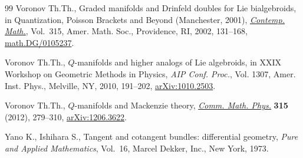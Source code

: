 \documentclass[11pt]{article}
\numberwithin{equation}{section}
\begin{document}
\begin{thebibliography}{99}
Voronov Th.Th., Graded manifolds and {D}rinfeld doubles for {L}ie bialgebroids,
  in Quantization, {P}oisson Brackets and Beyond ({M}anchester, 2001),
  \href{http://dx.doi.org/10.1090/conm/315/05478}{\textit{Contemp. Math.}}, Vol.~315, Amer. Math. Soc., Providence, RI, 2002,
  131--168, \href{http://arxiv.org/abs/math.DG/0105237}{math.DG/0105237}.

Voronov Th.Th., {$Q$}-manifolds and higher analogs of {L}ie algebroids, in X{XIX}
  {W}orkshop on {G}eometric {M}e\-thods in {P}hysics, \textit{AIP Conf. Proc.},
  Vol. 1307, Amer. Inst. Phys., Melville, NY, 2010, 191--202,
  \href{http://arxiv.org/abs/1010.2503}{arXiv:1010.2503}.

Voronov Th.Th., {$Q$}-manifolds and {M}ackenzie theory, \href{http://dx.doi.org/10.1007/s00220-012-1568-y}{\textit{Comm. Math.
  Phys.}} \textbf{315} (2012), 279--310, \href{http://arxiv.org/abs/1206.3622}{arXiv:1206.3622}.

Yano K., Ishihara S., Tangent and cotangent bundles: dif\/ferential geometry,
  \textit{Pure and Applied Mathematics}, Vol.~16, Marcel Dekker, Inc., New
  York, 1973.

\end{thebibliography}
\end{document}
